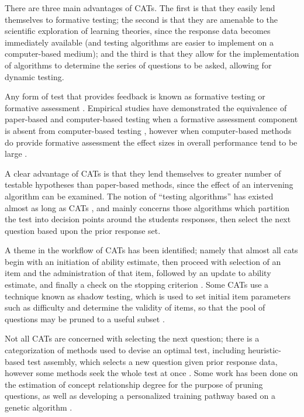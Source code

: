 There are three main advantages of CATs.  The first is that they easily lend
themselves to formative testing; the second is that they are amenable to the
scientific exploration of learning theories, since the response data becomes
immediately available (and testing algorithms are easier to implement on a
computer-based medium); and the third is that they allow for the implementation
of algorithms to determine the series of questions to be asked, allowing for
dynamic testing.

Any form of test that provides feedback is known as formative testing or
formative assessment \cite{bull2003blueprint}.  Empirical studies have
demonstrated the equivalence of paper-based and computer-based testing when a
formative assessment component is absent from computer-based testing
\cite{mead1993equivalence}, however when computer-based methods do provide
formative assessment the effect sizes in overall performance tend to be large
\cite{bangert1991instructional} \cite{lawton2012online}.

A clear advantage of CATs is that they lend themselves to greater number of
testable hypotheses than paper-based methods, since the effect of an
intervening algorithm can be examined.  \cite{mayer2002multimedia} The notion
of ``testing algorithms'' has existed almost as long as CATs
\cite{wainer2000computerized}, and mainly concerns those algorithms which
partition the test into decision points around the students responses, then
select the next question based upon the prior response set.

A theme in the workflow of CATs has been identified; namely that almost all
cats begin with an initiation of ability estimate, then proceed with selection
of an item and the administration of that item, followed by an update to
ability estimate, and finally a check on the stopping criterion
\cite{veldkamp2013bayesian}.  Some CATs use a technique known as shadow
testing, which is used to set initial item parameters such as difficulty and
determine the validity of items, so that the pool of questions may be pruned to
a useful subset \cite{van2000computerized}.

Not all CATs are concerned with selecting the next question; there is a
categorization of methods used to devise an optimal test, including
heuristic-based test assembly, which selects a new question given prior
response data, however some methods seek the whole test at once
\cite{van1998optimal}.  Some work has been done on the estimation of concept
relationship degree for the purpose of pruning questions, as well as developing
a personalized training pathway based on a genetic algorithm
\cite{chen2008intelligent}.  


